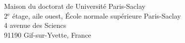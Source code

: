 \documentclass[french,12pt,twoside,a4paper]{book}
\begin{document}
\vspace{\fill} %

\noindent
\color{Prune} \footnotesize Maison du doctorat de Université Paris-Saclay\\
2$^{\mathrm{e}}$ étage, aile ouest, École normale supérieure Paris-Saclay\\
4 avenue des Sciencs\\
91190 Gif-sur-Yvette, France
\end{document}
